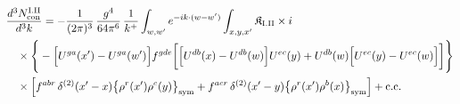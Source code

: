 \begingroup\small
\begin{align}\label{eq:H-I.II-2}
&\frac{d^{3}N^{\rm I.II}_{{\rm con}}}{d^{3}k}=-\frac{1}{(2\pi)^{3}}\, \frac{g^{4}}{64\pi^{6}}\, \frac{1}{k^{+}} \int_{w,w'}e^{-ik\cdot(w-w')} \int_{x,y,x'} \mathfrak{K}_{\rm I.II} \times i\notag\\
&\quad \times \Bigg\{-\Big[U^{ga}(x')-U^{ga}(w')\Big]f^{gde}\bigg[\Big[U^{db}(x)-U^{db}(w)\Big]U^{ec}(y) +U^{db}(w)\Big[U^{ec}(y)-U^{ec}(w)\Big]\bigg]\Bigg\}\notag\\
&\quad \times \Big[f^{abr}\, \delta^{(2)}(x'-x)\big\{\rho^{r}(x')\rho^{c}(y)\big\}_{\rm sym} +f^{acr}\, \delta^{(2)}(x'-y)\big\{\rho^{r}(x')\rho^{b}(x)\big\}_{\rm sym}\Big] +{\rm c.c.}
\end{align}
\endgroup
